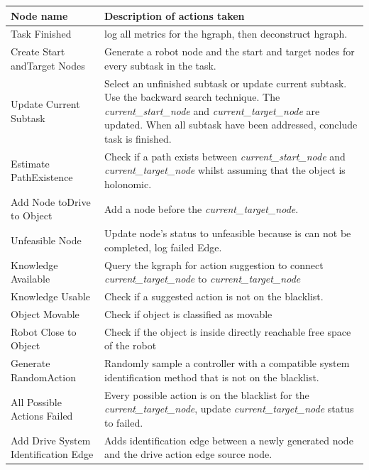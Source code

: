 \begin{table}[H]
\centering
{}
\begin{tabular}[t]{>{\raggedright}p{3.5cm}>{\raggedright\arraybackslash}p{10.5cm}}
  \textbf{Node name} & \textbf{Description of actions taken}\\\toprule
  Task Finished & log all metrics for the \ac{hgraph}, then deconstruct \ac{hgraph}.\\
  Create Start and\newline Target Nodes & Generate a robot node and the start and target nodes for every subtask in the task.\\
Update Current Subtask & Select an unfinished subtask or update current subtask. Use the backward search technique. The \textit{current\_start\_node} and \textit{current\_target\_node} are updated. When all subtask have been addressed, conclude task is finished. \\
Estimate Path\newline Existence & Check if a path exists between \textit{current\_start\_node} and \textit{current\_target\_node} whilst assuming that the object is holonomic.\\
Add Node to\newline Drive to Object & Add a node before the \textit{current\_target\_node}.\\
Unfeasible Node & Update node's status to unfeasible because is can not be completed, log failed Edge.\\
Knowledge Available& Query the \ac{kgraph} for action suggestion to connect \textit{current\_target\_node} to \textit{current\_target\_node}\\
Knowledge Usable& Check if a suggested action is not on the blacklist.\\
Object Movable & Check if object is classified as movable\\
Robot Close to Object& Check if the object is inside directly reachable free space of the robot \\
Generate Random\newline Action& Randomly sample a controller with a compatible system identification method that is not on the blacklist. \\
All Possible Actions Failed & Every possible action is on the blacklist for the \textit{current\_target\_node}, update \textit{current\_target\_node} status to failed.\\
Add Drive System Identification Edge & Adds identification edge between a newly generated node and the drive action edge source node. \\

\end{tabular}
\end{table}
